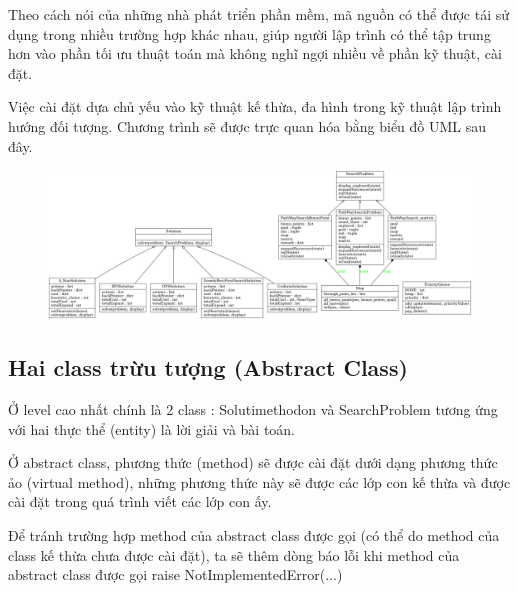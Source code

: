\documentclass[11pt]{article} %
\begin{document}
Theo cách nói của những nhà phát triển phần mềm, mã nguồn có thể được tái sử dụng trong nhiều trường hợp khác nhau, giúp người lập trình có thể tập trung hơn vào phần tối ưu thuật toán mà không nghĩ ngợi nhiều về phần kỹ thuật, cài đặt.

Việc cài đặt dựa chủ yếu vào kỹ thuật kế thừa, đa hình trong kỹ thuật lập trình hướng đối tượng. Chương trình sẽ được trực quan hóa bằng biểu đồ UML sau đây.

\newpage
\begin{figure}[h] %
	\centering
	\includegraphics[width=1.2\columnwidth]{Figures/UML.png} %
\end{figure}

\subsection{Hai class trừu tượng (Abstract Class)}
Ở level cao nhất chính là 2 class : Solutimethodon và SearchProblem tương ứng với hai thực thể (entity) là lời giải và bài toán.

Ở abstract class, phương thức (method) sẽ được cài đặt dưới dạng phương thức ảo (virtual method), những phương thức này sẽ được các lớp con kế thừa và được cài đặt trong quá trình viết các lớp con ấy.

Để tránh trường hợp method của abstract class được gọi (có thể do method của class kế thừa chưa được cài đặt), ta sẽ thêm dòng báo lỗi khi method của abstract class được gọi raise NotImplementedError(...)


\end{document}
